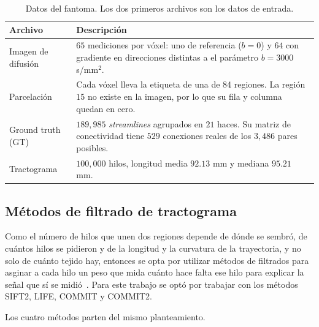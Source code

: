 \documentclass[11pt,a4paper]{article}
\newcommand{\code}[1]{\texttt{\small #1}}
\begin{document}
\begin{table}[H]
\centering
\small
\begin{tabularx}{\textwidth}{@{}lX@{}}
\toprule
\textbf{Archivo} & \textbf{Descripción}\\
\midrule
Imagen de difusión & $65$ mediciones por vóxel: uno de referencia ($b=0$) y $64$ con gradiente en direcciones distintas a el parámetro $b=3000$ s/mm$^2$.\\

Parcelación & Cada vóxel lleva la etiqueta de una de 84 regiones. La región $15$ no existe en la imagen, por lo que su fila y columna quedan en cero.\\

Ground truth (GT) & $189,985$ \textit{streamlines} agrupados en $21$ haces. Su matriz de conectividad tiene $529$ conexiones reales de los $3,486$ pares posibles.\\

Tractograma & $100,000$ hilos, longitud media $92.13$ mm y mediana $95.21$ mm.\\
\bottomrule
\end{tabularx}
\caption{Datos del fantoma. Los dos primeros archivos son los datos de entrada.}
\label{tab:datos}
\end{table}


\subsection{Métodos de filtrado de tractograma}

Como el número de hilos que unen dos regiones depende de dónde se sembró, de cuántos hilos se pidieron y de la longitud y la curvatura de la trayectoria, y no solo de cuánto tejido hay, entonces se opta por utilizar métodos de filtrados para asginar a cada hilo un peso que mida cuánto hace falta ese hilo para explicar la señal que sí se midió~\cite{smith2013}. Para este trabajo se optó por trabajar con los métodos SIFT2, LIFE, COMMIT y COMMIT2.

Los cuatro métodos parten del mismo planteamiento.
\end{document}
